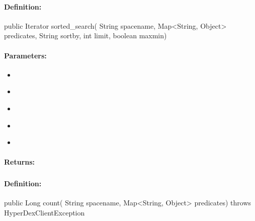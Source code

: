 \paragraph{Definition:}
\begin{javacode}
public Iterator sorted_search(
        String spacename,
        Map<String, Object> predicates,
        String sortby,
        int limit,
        boolean maxmin)
\end{javacode}

\paragraph{Parameters:}
\begin{itemize}[noitemsep]
\item {}\\

\item {}\\

\item {}\\

\item {}\\

\item {}\\

\end{itemize}

\paragraph{Returns:}


\pagebreak
\subsubsection{}
\label{api:java:count}


\paragraph{Definition:}
\begin{javacode}
public Long count(
        String spacename,
        Map<String, Object> predicates) throws HyperDexClientException
\end{javacode}

